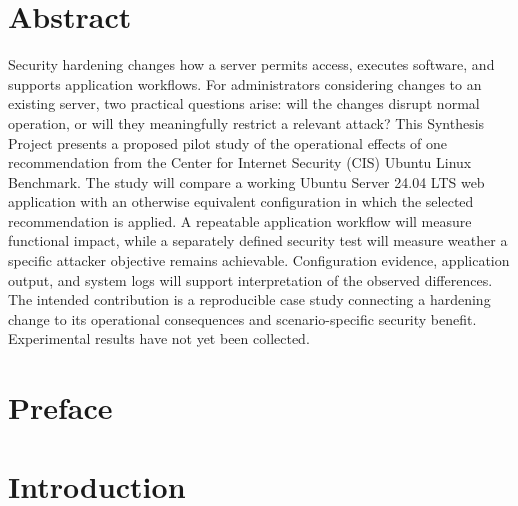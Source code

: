 \documentclass[12pt,letterpaper]{article}
\begin{document}
\setcounter{page}{3}

\newpage
\section*{Abstract}
\label{sec:orgd71f244}
{}

Security hardening changes how a server permits access, executes software, and supports application workflows. For administrators considering changes to an existing server, two practical questions arise: will the changes disrupt normal operation, or will they meaningfully restrict a relevant attack? This Synthesis Project presents a proposed pilot study of the operational effects of one recommendation from the Center for Internet Security (CIS) Ubuntu Linux Benchmark. The study will compare a working Ubuntu Server 24.04 LTS web application with an otherwise equivalent configuration in which the selected recommendation is applied. A repeatable application workflow will measure functional impact, while a separately defined security test will measure weather a specific attacker objective remains achievable. Configuration evidence, application output, and system logs will support interpretation of the observed differences. The intended contribution is a reproducible case study connecting a hardening change to its operational consequences and scenario-specific security benefit. Experimental results have not yet been collected. 


\newpage

\setcounter{tocdepth}{3}
\tableofcontents

\newpage


\clearpage
{}
{}
\listoffigures

\clearpage
{}
{}
\listoftables


\clearpage
\section*{Preface}
\label{sec:org678a4c6}
{}



\clearpage
{}
\section*{Introduction}
\label{sec:orgd35bd1e}
{}
\end{document}

